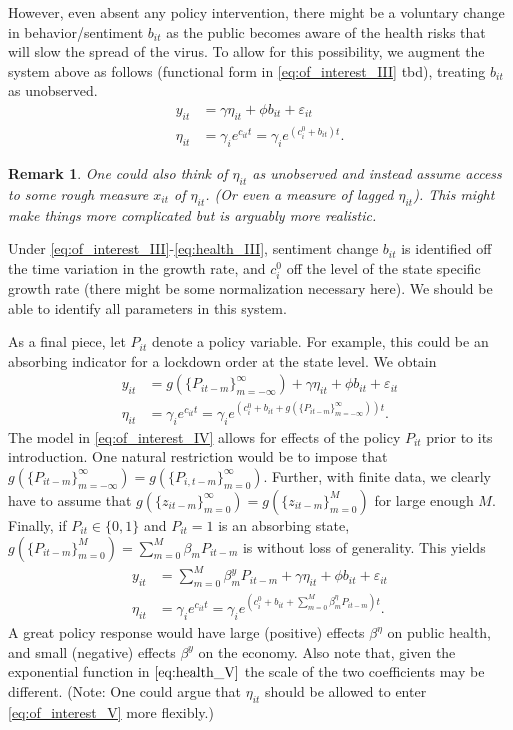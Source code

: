 \documentclass{article}[12pt]
\newtheorem{remark}{Remark}
\begin{document}
However, even absent any policy intervention, there might be a voluntary change in behavior/sentiment $b_{it}$ as the public becomes aware of the health risks that will slow the spread of the virus. To allow for this possibility, we augment the system above as follows (functional form in \eqref{eq:of_interest_III} tbd), treating $b_{it}$ as unobserved.
\begin{align}
y_{it} &=  \gamma \eta_{it} + \phi b_{it} + \varepsilon_{it} \label{eq:of_interest_III}\\
\eta_{it}&=\gamma_{i} e^{c_{it} t}= \gamma_{i} e^{(c^0_i + b_{it}) t}.  \label{eq:health_III}
\end{align}
\begin{remark}
One could also think of $\eta_{it}$ as unobserved and instead assume access to some rough measure $x_{it}$ of $\eta_{it}$. (Or even a measure of lagged $\eta_{it}$). This might make things more complicated but is arguably more realistic.
\end{remark}

Under \eqref{eq:of_interest_III}-\eqref{eq:health_III}, sentiment change $b_{it}$ is identified off the time variation in the growth rate, and $c_i^0$ off the level of the state specific growth rate (there might be some normalization necessary here). We should be able to identify all parameters in this system.


As a final piece, let $P_{it}$ denote a policy variable. For example, this could be an absorbing indicator for a lockdown order at the state level.  We obtain
\begin{align}
y_{it} &=  g(\{P_{it-m}\}_{m=-\infty}^{\infty}) + \gamma \eta_{it} + \phi b_{it} + \varepsilon_{it} \label{eq:of_interest_IV}\\
\eta_{it}&=\gamma_{i} e^{c_{it} t}=\gamma_{i} e^{(c^0_i + b_{it} + g(\{P_{it-m}\}_{m=-\infty}^{\infty})) t}. \label{eq:health_IV}
\end{align}
The model in \eqref{eq:of_interest_IV} allows for effects of the policy $P_{it}$ prior to its introduction. One natural restriction would be to impose that $g(\{P_{it-m}\}_{m=-\infty}^{\infty}) =g(\{P_{i,t-m}\}_{m=0}^{\infty})$. Further, with finite data, we clearly have to assume that $g(\{z_{it-m}\}_{m=0}^{\infty}) = g(\{z_{it-m}\}_{m=0}^{M})$ for large enough $M$. Finally, if $P_{it} \in \{0,1\}$ and $P_{it} = 1$ is an absorbing state, $g(\{P_{it-m}\}_{m=0}^{M}) = \sum_{m=0}^M \beta_m P_{it-m}$ is without loss of generality. %
This yields
\begin{align}
y_{it} &=  \sum_{m=0}^M \beta^y_m P_{it-m} + \gamma \eta_{it} + \phi b_{it} + \varepsilon_{it} \label{eq:of_interest_V}\\
\eta_{it}&=\gamma_{i} e^{c_{it} t}=\gamma_{i} e^{(c^0_i + b_{it} + \sum_{m=0}^M \beta^\eta_m P_{it-m} ) t}. \label{eq:health_V}
\end{align}
A great policy response would have large (positive) effects $\beta^\eta$ on public health, and small (negative) effects $\beta^y$ on the economy. Also note that, given the exponential function in $\eqref{eq:health_V}$ the scale of the two coefficients may be different. (Note: One could argue that $\eta_{it}$ should be allowed to enter \ref{eq:of_interest_V} more flexibly.)
\end{document}
